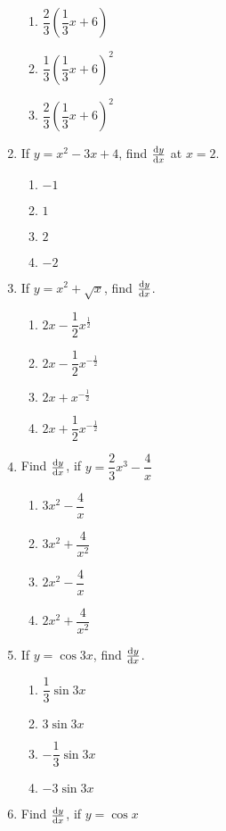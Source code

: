 \begin{multicols}{2}
\begin{enumerate}[label={\arabic*.}]
\begin{enumerate}[label={\Alph*.}]
        \item \(\dfrac{2}{3}{\left(\dfrac{1}{3}x + 6\right)}\)
        \item \(\dfrac{1}{3}{\left(\dfrac{1}{3}x + 6\right)}^{2}\)
        \item \(\dfrac{2}{3}{\left(\dfrac{1}{3}x + 6\right)}^{2}\)
      \end{enumerate}
    \item If \(y = {x}^{2}-3{x}+4\), find \(\frac{\mathrm{d}y}{\mathrm{d}x}\) at \(x = 2\).
      \begin{enumerate}[label={\Alph*.}]
        \item \(-1\)
        \item \(1\)
        \item \(2\)
        \item \(-2\)
      \end{enumerate}
    \item If  \(y = {x}^{2}+\sqrt{x}\), find \(\frac{\mathrm{d}y}{\mathrm{d}x}\).
      \begin{enumerate}[label={\Alph*.}]
        \item \(2x-\dfrac{1}{2}x^{\frac{1}{2}}\)
        \item \(2x-\dfrac{1}{2}x^{-{\frac{1}{2}}}\)
        \item \(2x+x^{-{\frac{1}{2}}}\)
        \item \(2x+\dfrac{1}{2}x^{-{\frac{1}{2}}}\)
      \end{enumerate}
    \item Find \(\frac{\mathrm{d}y}{\mathrm{d}x}\), if \(y = \dfrac{2}{3}{x}^{3}-\dfrac{4}{x}\)
      \begin{enumerate}[label={\Alph*.}]
        \item \({3}{x}^{2}-\dfrac{4}{x}\)
        \item \({3}{x}^{2}+\dfrac{4}{x^{2}}\)
        \item \({2}{x}^{2}-\dfrac{4}{x}\)
        \item \({2}{x}^{2}+\dfrac{4}{x^{2}}\)
      \end{enumerate}
    \item If \(y = \cos{3x}\), find \(\frac{\mathrm{d}y}{\mathrm{d}x}\).
      \begin{enumerate}[label={\Alph*.}]
        \item \(\dfrac{1}{3}\sin{3x}\)
        \item \({3}\sin{3x}\)
        \item \(-{\dfrac{1}{3}}\sin{3x}\)
        \item \(-3\sin{3x}\)
      \end{enumerate}
    \item Find \(\frac{\mathrm{d}y}{\mathrm{d}x}\), if \(y = \cos{x}\)

\end{enumerate}
\end{multicols}
